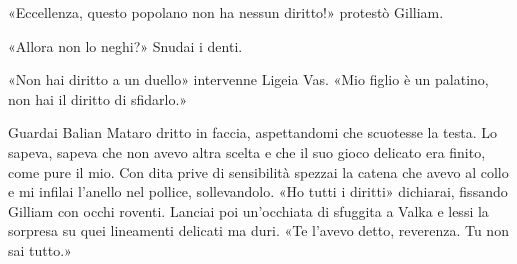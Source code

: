 «Eccellenza, questo popolano non ha nessun diritto!» protestò Gilliam.

«Allora non lo neghi?» Snudai i denti.

«Non hai diritto a un duello» intervenne Ligeia Vas. «Mio figlio è un
palatino, non hai il diritto di sfidarlo.»

Guardai Balian Mataro dritto in faccia, aspettandomi che scuotesse la
testa. Lo sapeva, sapeva che non avevo altra scelta e che il suo gioco
delicato era finito, come pure il mio. Con dita prive di sensibilità
spezzai la catena che avevo al collo e mi infilai l'anello nel pollice,
sollevandolo. «Ho tutti i diritti» dichiarai, fissando Gilliam con occhi
roventi. Lanciai poi un'occhiata di sfuggita a Valka e lessi la sorpresa
su quei lineamenti delicati ma duri. «Te l'avevo detto, reverenza. Tu
non sai tutto.»


